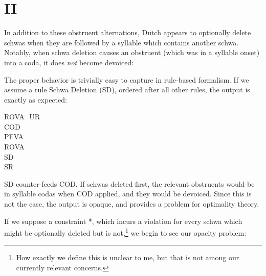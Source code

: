 \documentclass[doc,12pt]{apa6}
\begin{document}
\section{II}

In addition to these obstruent alternations, Dutch appears to optionally delete
schwas when they are followed by a syllable which contains another schwa.
Notably, when schwa deletion causes an obstruent (which was in a syllable
onset) into  a coda, it does \emph{not} become devoiced:

\begin{exe}
	\ex {}
\end{exe}

The proper behavior is trivially easy to capture in rule-based formalism. If we
assume a rule Schwa Deletion (SD), ordered after all other rules, the output is
exactly as expected:

\begin{minipage}{\textwidth}
\begin{exe}
	\ex \begin{tabbing}
		ROVA \= \= \kill
		UR   \>  \\
		COD \\
		PFVA \\
		ROVA \\
		SD \> \> \\
		SR 
		\end{tabbing}
\end{exe}
\end{minipage}

SD counter-feeds COD. If schwas deleted first, the relevant obstruents would be
in syllable codas when COD applied, and they would be devoiced. Since this is
not the case, the output is opaque, and provides a problem for optimality
theory.

If we suppose a constraint *, which incurs a violation for every
schwa which might be optionally deleted but is not,\footnote{How exactly we
define this is unclear to me, but that is not among our currently relevant
concerns.} we begin to see our opacity problem:

\begin{center}
\end{center}
\end{document}
